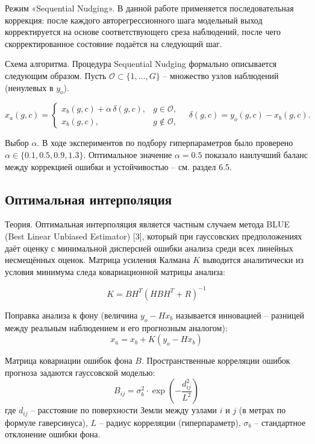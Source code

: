 \documentclass[14pt,a4paper]{extarticle}
\numberwithin{table}{section}
\numberwithin{figure}{section}
\numberwithin{equation}{section}
\begin{document}
Режим «Sequential Nudging». В данной работе применяется
последовательная коррекция: после каждого авторегрессионного шага
модельный выход корректируется на основе
соответствующего среза наблюдений, после чего скорректированное
состояние подаётся на следующий шаг.

Схема алгоритма. Процедура Sequential Nudging формально
описывается следующим образом. Пусть
\(\mathcal{O} \subset \{1,\ldots,G\}\) -- множество узлов наблюдений
(ненулевых в \(y_o\)).

\[x_a(g, c) = \begin{cases} x_b(g,c) + \alpha\,\delta(g,c), & g \in \mathcal{O},\\ x_b(g,c), & g \notin \mathcal{O}, \end{cases} \quad \delta(g,c) = y_o(g,c) - x_b(g,c).\]

Выбор \(\alpha\). В ходе экспериментов по подбору
гиперпараметров было проверено \(\alpha \in \{0.1, 0.5, 0.9, 1.3\}\).
Оптимальное значение \(\alpha = 0.5\) показало наилучший баланс между
коррекцией ошибки и устойчивостью -- см. раздел 6.5.

\subsection{Оптимальная интерполяция}\label{ux43eux43fux442ux438ux43cux430ux43bux44cux43dux430ux44f-ux438ux43dux442ux435ux440ux43fux43eux43bux44fux446ux438ux44f}

Теория. Оптимальная интерполяция является частным случаем
метода BLUE (Best Linear Unbiased Estimator) {[}3{]}, который при
гауссовских предположениях даёт оценку с минимальной дисперсией
ошибки анализа среди всех линейных несмещённых оценок. Матрица
усиления Калмана \(K\) выводится аналитически из условия минимума
следа ковариационной матрицы анализа:

\[K = B H^T (H B H^T + R)^{-1}\]

Поправка анализа к фону (величина \(y_o - H x_b\) называется
инновацией -- разницей между реальным наблюдением и его
прогнозным аналогом):
\[x_a = x_b + K (y_o - H x_b)\]

Матрица ковариации ошибок фона \(B\). Пространственные
корреляции ошибок прогноза задаются гауссовской моделью:
\[B_{ij} = \sigma_b^2 \cdot \exp\left(-\frac{d_{ij}^2}{L^2}\right)\] где
\(d_{ij}\) -- расстояние по поверхности Земли между узлами \(i\) и
\(j\) (в метрах по формуле гаверсинуса), \(L\) -- радиус корреляции
(гиперпараметр), \(\sigma_b\) -- стандартное отклонение ошибки фона.
\end{document}
